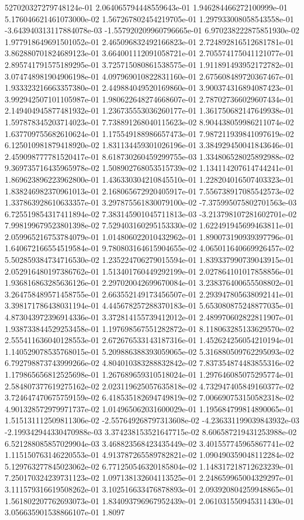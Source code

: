 527020327279748124e-01	2.064065794448559643e-01	1.946284466272100999e-01	5.176046621461073000e-02	1.567267802454219705e-01	1.297933008058543558e-01	-3.643940313117884078e-03	-1.557920209960796665e-01	6.970238222875851930e-02	1.977918649691501052e-01	2.465096832492166823e-01	2.724892816512681781e-01	3.862880701824689123e-01	3.664001112091058721e-01	2.705574175041121077e-01	2.895741791575189295e-01	3.725715080861538575e-01	1.911891493952172782e-01	3.074748981904906198e-01	4.097969010822831160e-01	2.675608489720367467e-01	1.933323216663357380e-01	2.449884049520169860e-01	3.900374316894087423e-01	3.992942507101105987e-01	1.980622648274668607e-01	2.787027366029607434e-01	2.149404945877481932e-01	1.236735553036260177e-01	1.361750682147649938e-01	1.597878345203714023e-01	7.738891268040115623e-02	8.904438059986211074e-02	1.637709755682610624e-01	1.175549188986657473e-01	7.987211939841097619e-02	6.125010981879418920e-02	1.831134459301026196e-01	3.384929450041843646e-01	2.459098777781520417e-01	8.618730260459299755e-03	1.334806528025892988e-02	9.369735716435965978e-02	1.508902768053515739e-02	1.134114207614744241e-01	1.869623896223962800e-01	1.436330304210845510e-01	1.228204016507403323e-01	1.838246982370961013e-01	2.168065672920405917e-01	7.556738917085542573e-02	1.337863928610633357e-01	3.297875561830079100e-02	-7.375995075802701563e-03	6.725519854317411894e-02	7.383145901045711813e-03	-3.213798107281602701e-02	7.998199679523801398e-02	7.529403160295153330e-02	1.622491945699463811e-01	2.059965216753784079e-01	1.014806022010432962e-01	1.890073190939397796e-01	1.640672166554519584e-01	9.780803164615904655e-02	4.065011640669926457e-02	5.502859384734716530e-02	1.235224706279015594e-01	1.839337990739043915e-01	2.052916480197386762e-01	1.513401760449292199e-01	2.027864101017858856e-01	1.936816863285636126e-01	2.297020042699670084e-01	3.238376400655508802e-01	3.264758489571458755e-01	2.663552149173456507e-01	2.293947805638092141e-01	3.398171786438031194e-01	4.445678257288370183e-01	5.653080875248877035e-01	4.873043972396914336e-01	3.372814155739412012e-01	2.489970602822811907e-01	1.938733844529253458e-01	1.197698567551282872e-01	8.118063285133629570e-02	2.555411636040128553e-01	2.672676533143187316e-01	1.452624256054210194e-01	1.140529078535768015e-01	5.209886388393059065e-02	5.316880509762295093e-02	6.792798873743999266e-02	4.804010383288832842e-02	7.837354874483855316e-02	1.179865656812525698e-01	1.267689659310518024e-01	1.297646085075295774e-01	2.584807377619275162e-02	2.023119625057635818e-02	4.732947405849160377e-02	3.724647470675759159e-02	6.418535182694749819e-02	7.006690753150582318e-02	4.901328572979971737e-02	1.014965062031600029e-01	1.195684799814890065e-01	1.515131112509811306e-02	-2.557649268797313608e-02	-4.236331199039843932e-03	-2.199342944330470988e-03	3.374238153521647715e-02	8.606587219431253988e-02	6.521288085857029904e-03	3.468823568423435449e-02	3.401557745965867741e-02	1.115150763146220553e-01	4.913787265589782821e-02	1.090490359048112284e-02	5.129763277845023062e-02	6.771250546320185804e-02	1.148317218712623239e-01	7.250170324239731123e-02	1.097138132604113525e-01	2.248659965004329297e-01	3.111579316619508262e-01	3.102516633476878893e-01	2.093920804259948865e-01	1.561802207762693073e-01	1.834093796967952439e-01	2.061031550945311430e-01	3.056635901538866107e-01	1.8097